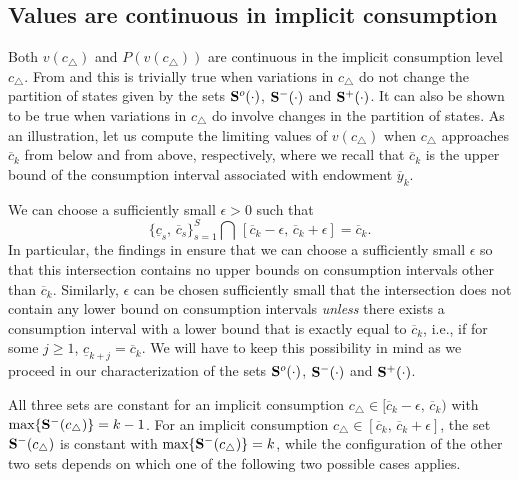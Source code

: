 \subsection{Values are continuous in implicit consumption}\label{sec:Koch_continuous_c}%
Both $v(c_{\triangle})$ and
$P\!\left(v(c_{\triangle})\right)$ are continuous in the implicit
consumption level $c_{\triangle}$. From  and 
this is trivially true when variations
in $c_{\triangle}$ do not change the partition of states given by
the sets ${\bf S}^o(\cdot)$, ${\bf S}^-(\cdot)$ and
${\bf S}^+(\cdot)$. It can also be shown to be true when variations in
$c_{\triangle}$ do involve changes in the partition of states.
As an illustration, let us compute the limiting values of
$v(c_{\triangle})$ when $c_{\triangle}$ approaches $\overline c_k$
from below and from above, respectively, where we recall that
$\overline c_k$ is the upper bound of the consumption interval
associated with endowment $\overline y_k$.

We can choose a sufficiently small $\epsilon>0$ such that
$$
\{\underline c_s,\, \overline c_s\}_{s=1}^S \bigcap \,
[\overline c_k - \epsilon, \, \overline c_k + \epsilon] = \overline c_k.
$$
In particular,
the findings in  ensure that we can choose
a sufficiently small $\epsilon$ so that this intersection contains
no upper bounds on consumption intervals other than $\overline c_k$.
Similarly, $\epsilon$ can be chosen sufficiently small  that
the intersection does not contain any lower bound on consumption
intervals {\it unless} there exists a consumption interval with
a lower bound that is exactly equal to $\overline c_k$, i.e., if for
some $j\geq 1$, $\underline c_{k+j} = \overline c_k$.
We will have to keep this possibility in mind as we proceed in our
characterization of the sets ${\bf S}^o(\cdot)$, ${\bf S}^-(\cdot)$
and ${\bf S}^+(\cdot)$.

All three sets are constant for an implicit consumption
$c_{\triangle}\in[\overline c_k-\epsilon,\, \overline c_k)$ with
$\max\{{\bf S}^-(c_{\triangle} )\}=k-1$. For an implicit consumption
$c_{\triangle} \in[\overline c_k,\, \overline c_k+\epsilon]$, the set
${\bf S}^-(c_{\triangle})$ is constant with
$\max\{{\bf S}^-(c_{\triangle})\}=k$, while
the configuration of the other two sets depends on which one
of the following two possible cases applies.




